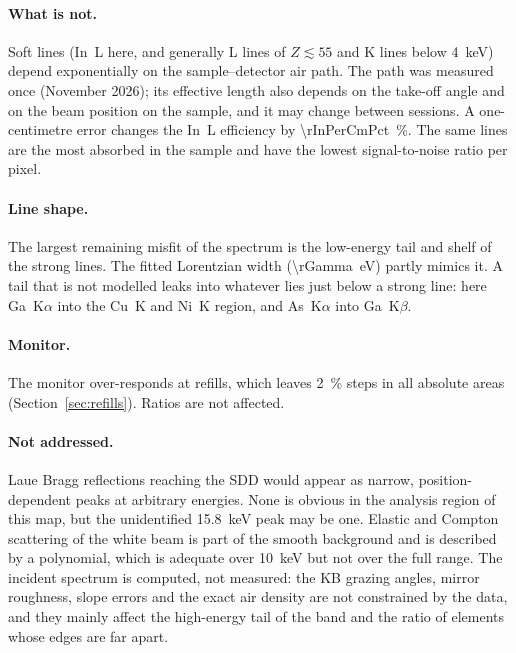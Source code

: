 \documentclass[11pt,a4paper]{article}
\begin{document}
\paragraph{What is not.} Soft lines (In~L here, and generally L lines of $Z\lesssim55$ and K lines below
\qty{4}{keV}) depend exponentially on the sample--detector air path. The path was measured once
(November 2026); its effective length also depends on the take-off angle and on the beam position on
the sample, and it may change between sessions. A one-centimetre error changes the In~L efficiency by \qty{\rInPerCmPct}{\percent}. The same
lines are the most absorbed in the sample and have the lowest signal-to-noise ratio per pixel.

\paragraph{Line shape.} The largest remaining misfit of the spectrum is the low-energy tail and shelf of
the strong lines. The fitted Lorentzian width (\qty{\rGamma}{eV}) partly mimics it. A tail that is not
modelled leaks into whatever lies just below a strong line: here Ga~K$\alpha$ into the Cu~K and Ni~K
region, and As~K$\alpha$ into Ga~K$\beta$.

\paragraph{Monitor.} The monitor over-responds at refills, which leaves \qty{2}{\percent} steps in all
absolute areas (Section~\ref{sec:refills}). Ratios are not affected.

\paragraph{Not addressed.} Laue Bragg reflections reaching the SDD would appear as narrow, position-dependent
peaks at arbitrary energies. None is obvious in the analysis region of this map, but the unidentified
\qty{15.8}{keV} peak may be one. Elastic and Compton scattering of the white beam is part of the
smooth background and is described by a polynomial, which is adequate over \qty{10}{keV} but not over
the full range. The incident spectrum is computed, not measured: the KB grazing angles, mirror roughness, slope
errors and the exact air density are not constrained by the data, and they mainly affect the high-energy tail of the
band and the ratio of elements whose edges are far apart.

\end{document}

